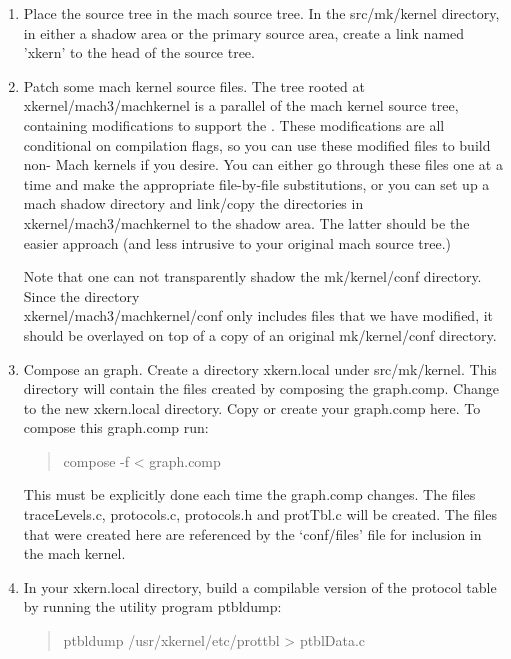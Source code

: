 \begin{enumerate}

\item Place the \xk{} source tree in the mach source tree.
In the src/mk/kernel directory, in either a shadow area or the primary
source area, create a link named 'xkern' to the head of the \xk{}
source tree.  


\item Patch some mach kernel source files.
The tree rooted at xkernel/mach3/machkernel is a parallel of the mach
kernel source tree, containing modifications to support the \xk{}.
These modifications are all conditional on \xk{} compilation flags, so
you can use these modified files to build non-\xk{} Mach kernels if
you desire.  You can either go through these files one at a time and
make the appropriate file-by-file substitutions, or you can set up a
mach shadow directory and link/copy the directories in
xkernel/mach3/machkernel to the shadow area.  The latter should be the
easier approach (and less intrusive to your original mach source
tree.)

Note that one can not transparently shadow the mk/kernel/conf
directory.  Since the directory\\ xkernel/mach3/machkernel/conf 
only includes files
that we have modified, it should be overlayed on top of a copy of an
original mk/kernel/conf directory.

\item Compose an \xk{} graph.
Create a directory xkern.local under src/mk/kernel. This directory will
contain the files created by composing the graph.comp. 
Change to the new xkern.local directory. Copy or create your
graph.comp here. To compose this graph.comp run:

\begin{quote}
\begin{tt}
   	compose -f < graph.comp
\end{tt}
\end{quote}

This must be explicitly done each time the graph.comp changes. The files
traceLevels.c, protocols.c, protocols.h and protTbl.c will be created.
The files that were created here are referenced by the `conf/files' file for
inclusion in the mach kernel.


\item 
In your xkern.local directory, build a compilable version of the
protocol table by running the \xk{} utility program ptbldump:
 
\begin{quote}
\begin{tt}
  	ptbldump /usr/xkernel/etc/prottbl > ptblData.c
\end{tt}
\end{quote}


\end{enumerate}
